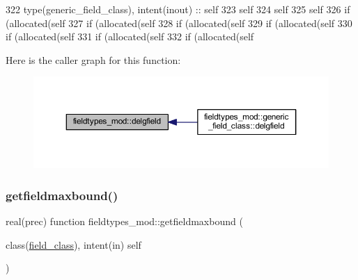 \begin{DoxyCode}
322     \textcolor{keywordtype}{type}(generic\_field\_class), \textcolor{keywordtype}{intent(inout)} :: self
323     self%
324     self%
325     self%
326     \textcolor{keywordflow}{if} (\textcolor{keyword}{allocated}(self%
327     \textcolor{keywordflow}{if} (\textcolor{keyword}{allocated}(self%
328     \textcolor{keywordflow}{if} (\textcolor{keyword}{allocated}(self%
329     \textcolor{keywordflow}{if} (\textcolor{keyword}{allocated}(self%
330     \textcolor{keywordflow}{if} (\textcolor{keyword}{allocated}(self%
331     \textcolor{keywordflow}{if} (\textcolor{keyword}{allocated}(self%
332     \textcolor{keywordflow}{if} (\textcolor{keyword}{allocated}(self%
\end{DoxyCode}
Here is the caller graph for this function\+:\nopagebreak
\begin{figure}[H]
\begin{center}
\leavevmode
\includegraphics[width=350pt]{namespacefieldtypes__mod_a4ec7b627804dfcdf20e3374ecc1cf459_icgraph}
\end{center}
\end{figure}
\mbox{\label{namespacefieldtypes__mod_a1012f73b2800753dd774d0dbff861b6f}} 
\subsubsection{\texorpdfstring{getfieldmaxbound()}{getfieldmaxbound()}}
{\footnotesize\ttfamily real(prec) function fieldtypes\+\_\+mod\+::getfieldmaxbound (\begin{DoxyParamCaption}\item[{class(\mbox{\hyperlink{structfieldtypes__mod_1_1field__class}{field\+\_\+class}}), intent(in)}]{self }\end{DoxyParamCaption})\hspace{0.3cm}{\ttfamily [private]}}



